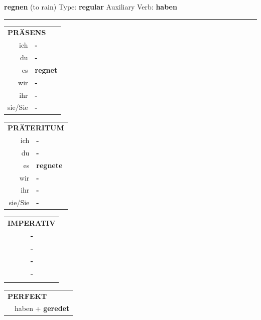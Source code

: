 \documentclass[10pt,a4paper]{revtex4-2}
\begin{document}
\begin{verbbox}
    {\Large \bf regnen} (to rain) \hfill Type: \textbf{regular} \hfill Auxiliary Verb: \textbf{haben} 
    
     \vspace{5pt}

    \hrule
    
    \vspace{5pt}

  \begin{tabular}{rl}
     \multicolumn{2}{l}{\textbf{PRÄSENS} }\\
    ich & \textbf{-}\\
    du & \textbf{-}\\
    es & \textbf{regnet}\\
    wir & \textbf{-}\\
    ihr & \textbf{-}\\
    sie/Sie & \textbf{-}\\
  \end{tabular}
  \hfill
     \begin{tabular}{rl}
    \multicolumn{2}{l}{\textbf{PRÄTERITUM} }\\
    ich & \textbf{-}\\
    du & \textbf{-}\\
    es & \textbf{regnete}\\
    wir & \textbf{-}\\
    ihr & \textbf{-}\\
    sie/Sie & \textbf{-}\\
  \end{tabular}
  \hfill
  \begin{tabular}{rl}
     \multicolumn{2}{l}{\textbf{IMPERATIV} }\\
   & \textbf{-}\\
   & \textbf{-}\\
   & \textbf{-}\\
   & \textbf{-}\\
   & \vspace{10pt}
  \end{tabular}

    \vspace{10pt}

 \begin{tabular}{rl}
     \multicolumn{2}{l}{\textbf{PERFEKT}}\\
  &  haben + \textbf{geredet}\\
  \end{tabular}
\hfill
   \begin{tabular}{rl}
   

\end{tabular}
\end{verbbox}
\end{document}
